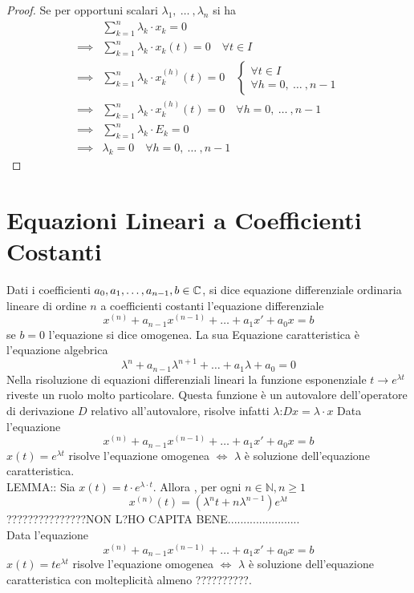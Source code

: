 \begin{proposition}
\begin{proof}
		Se per opportuni scalari $\lambda_1,\:\dotsc\:,\lambda_n$ si ha
		\begin{align*}
			& \sum\limits_{k=1}^{n} \lambda_k \cdot x_k = 0\\
			\implies & \sum\limits_{k=1}^{n} \lambda_k \cdot x_k(t) = 0 \quad \forall t \in I\\
			\implies & \sum\limits_{k=1}^{n} \lambda_k \cdot x_k^{(h)}(t) = 0 \quad \begin{cases}\forall t \in I\\\forall h = 0,\:\dotsc\:, n-1	\end{cases}\\
			\implies & \sum\limits_{k=1}^{n} \lambda_k \cdot x_k^{(h)}(t) = 0 \quad \forall h = 0,\:\dotsc\:, n-1\\
			\implies & \sum\limits_{k=1}^{n} \lambda_k \cdot E_k = 0\\
			\implies & \lambda_k = 0\quad \forall h = 0,\:\dotsc\:, n-1
		\end{align*}
	\end{proof}
\end{proposition}
\color{black}

\color{not_explained_section_color}
\section{Equazioni Lineari a Coefficienti Costanti}
Dati i coefficienti $a_0,a_1,\ldots,a_{n-1},b\in\mathbb{C}$, si dice equazione differenziale ordinaria lineare di ordine $n$ a coefficienti costanti l'equazione differenziale
$$x^{(n)}+a_{n-1}x^{(n-1)}+\ldots+a_1 x'+a_0x=b$$
se $b=0$ l'equazione si dice omogenea. La sua Equazione caratteristica è l'equazione algebrica
$$\lambda^n+a_{n-1}\lambda^{n+1}+\ldots+a_1\lambda+a_0=0$$ 
\observation
Nella risoluzione di equazioni differenziali lineari la funzione esponenziale $t\to e^{\lambda t}$ riveste un ruolo molto particolare. Questa funzione è un autovalore dell'operatore di derivazione $D$ relativo all'autovalore, risolve infatti $\lambda$:$Dx=\lambda\cdot x$ 
\proposition
Data l'equazione
$$x^{(n)}+a_{n-1}x^{(n-1)}+\ldots+a_1 x'+a_0x=b$$
$x(t)=e^{\lambda t}$ risolve l'equazione omogenea $\iff$ $\lambda$ è soluzione dell'equazione caratteristica.\\

LEMMA:: Sia $x(t)=t\cdot e^{\lambda\cdot t}$. Allora , per ogni $n\in\mathbb{N}, n\ge 1$
$$x^{(n)}(t)=\left(\lambda^nt+n\lambda^{n-1}\right)e^{\lambda t}$$
???????????????NON L?HO CAPITA BENE.......................\\
\proposition
Data l'equazione 
$$x^{(n)}+a_{n-1}x^{(n-1)}+\ldots+a_1 x'+a_0x=b$$
$x(t)=te^{\lambda t}$ risolve l'equazione omogenea $\iff$ $\lambda$ è soluzione dell'equazione caratteristica con molteplicità almeno ??????????.
\color{black}

